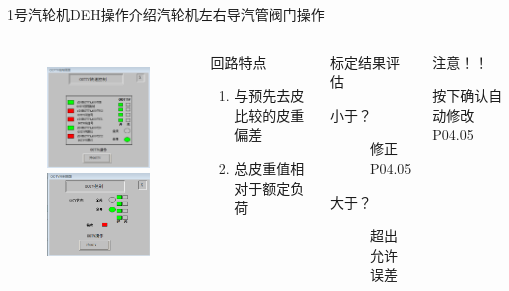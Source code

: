 \documentclass[12pt,hyperref={CJKbookmarks=true}]{beamer} %
\begin{document}
\begin{frame}{1号汽轮机DEH操作介绍}{汽轮机左右导汽管阀门操作}
  		\begin{columns}
\begin{figure}
\includegraphics[angle=0,width=150pt,trim=0 0 0 0,clip]{pic/oottv.png}\\
\includegraphics[angle=0,width=150pt,trim=0 0 0 0,clip]{pic/ootv.png}
	
\end{figure}
\begin{block}{回路特点}
			\begin{enumerate}
				\item  与预先去皮比较的皮重偏差
				\item  总皮重值相对于额定负荷
				\end{enumerate}
\end{block}
\begin{exampleblock}{标定结果评估}
			\begin{description}
				\item[小于？]修正P04.05
				\item[大于？]超出允许误差
				\end{description}
\end{exampleblock}
\begin{alertblock}{注意！！}
			
				按下确认自动修改P04.05
\end{alertblock}
		\end{columns}
\end{frame}
\end{document}
